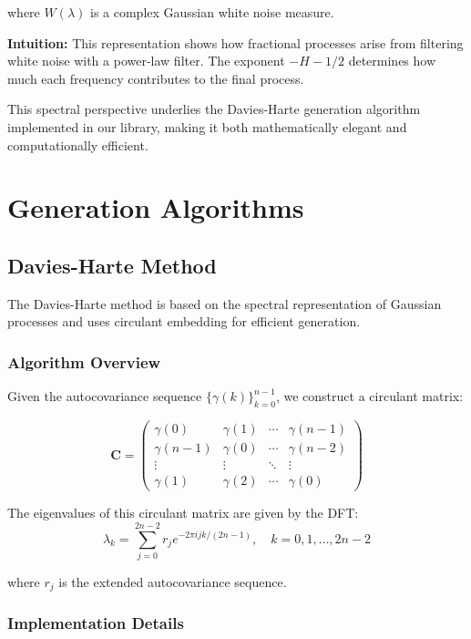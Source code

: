 \documentclass[11pt,a4paper]{article}
\begin{document}
where $W(\lambda)$ is a complex Gaussian white noise measure.

\textbf{Intuition:} This representation shows how fractional processes arise from filtering white noise with a power-law filter. The exponent $-H-1/2$ determines how much each frequency contributes to the final process.

This spectral perspective underlies the Davies-Harte generation algorithm implemented in our library, making it both mathematically elegant and computationally efficient.

\section{Generation Algorithms}

\subsection{Davies-Harte Method}

The Davies-Harte method is based on the spectral representation of Gaussian processes and uses circulant embedding for efficient generation.

\subsubsection{Algorithm Overview}

Given the autocovariance sequence $\{\gamma(k)\}_{k=0}^{n-1}$, we construct a circulant matrix:

\begin{equation}
\mathbf{C} = \begin{pmatrix}
\gamma(0) & \gamma(1) & \cdots & \gamma(n-1) \\
\gamma(n-1) & \gamma(0) & \cdots & \gamma(n-2) \\
\vdots & \vdots & \ddots & \vdots \\
\gamma(1) & \gamma(2) & \cdots & \gamma(0)
\end{pmatrix}
\end{equation}

The eigenvalues of this circulant matrix are given by the DFT:
\begin{equation}
\lambda_k = \sum_{j=0}^{2n-2} r_j e^{-2\pi i jk/(2n-1)}, \quad k = 0, 1, \ldots, 2n-2
\end{equation}

where $r_j$ is the extended autocovariance sequence.

\subsubsection{Implementation Details}
\end{document}
